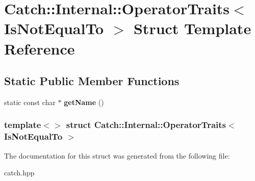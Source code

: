 \hypertarget{structCatch_1_1Internal_1_1OperatorTraits_3_01IsNotEqualTo_01_4}{
\section{Catch::Internal::OperatorTraits$<$ IsNotEqualTo $>$ Struct Template Reference}
\label{structCatch_1_1Internal_1_1OperatorTraits_3_01IsNotEqualTo_01_4}
}
\subsection*{Static Public Member Functions}
\begin{DoxyCompactItemize}
\item 
\hypertarget{structCatch_1_1Internal_1_1OperatorTraits_3_01IsNotEqualTo_01_4_a54a795b8bf7c80a9fdbc7b81f39133b4}{
static const char $\ast$ {\bfseries getName} ()}
\label{structCatch_1_1Internal_1_1OperatorTraits_3_01IsNotEqualTo_01_4_a54a795b8bf7c80a9fdbc7b81f39133b4}

\end{DoxyCompactItemize}
\subsubsection*{template$<$$>$ struct Catch::Internal::OperatorTraits$<$ IsNotEqualTo $>$}



The documentation for this struct was generated from the following file:\begin{DoxyCompactItemize}
\item 
catch.hpp\end{DoxyCompactItemize}
